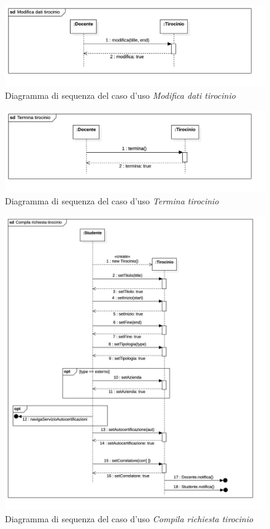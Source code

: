 \documentclass[12pt]{article}
\begin{document}
\begin{figure}[htb!]
   \centering
   \includegraphics[width=\textwidth]{images/Modifica dati tirocinio.jpg}
   \caption*{Diagramma di sequenza del caso d'uso \emph{Modifica dati tirocinio}}
\end{figure}

\begin{figure}[htb!]
   \centering
   \includegraphics[width=\textwidth]{images/Termina tirocinio.jpg}
   \caption*{Diagramma di sequenza del caso d'uso \emph{Termina tirocinio}}
\end{figure}

\begin{figure}[htb!]
   \centering
   \includegraphics[width=\textwidth]{images/Compila richiesta tirocinio.jpg}
   \caption*{Diagramma di sequenza del caso d'uso \emph{Compila richiesta tirocinio}}
\end{figure}
\end{document}
